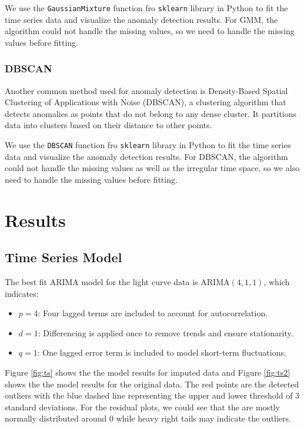 \documentclass[
]{article}
\begin{document}
We use the \texttt{GaussianMixture} function fro \texttt{sklearn} library in Python to fit the time series data and visualize the anomaly detection results. For GMM, the algorithm could not handle the missing values, so we need to handle the missing values before fitting.

\subsubsection{DBSCAN}\label{dbscan}

Another common method used for anomaly detection is Density-Based Spatial Clustering of Applications with Noise (DBSCAN), a clustering algorithm that detects anomalies as points that do not belong to any dense cluster. It partitions data into clusters based on their distance to other points.

We use the \texttt{DBSCAN} function fro \texttt{sklearn} library in Python to fit the time series data and visualize the anomaly detection results. For DBSCAN, the algorithm could not handle the missing values as well as the irregular time space, so we also need to handle the missing values before fitting.

\section{Results}\label{results}

\subsection{Time Series Model}\label{time-series-model}

The best fit ARIMA model for the light curve data is ARIMA\((4,1,1)\), which indicates:

\begin{itemize}
    \item $p = 4$: Four lagged terms are included to account for autocorrelation.
    \item $d = 1$: Differencing is applied once to remove trends and ensure stationarity.
    \item $q = 1$: One lagged error term is included to model short-term fluctuations.
\end{itemize}

Figure \ref{fig:ts} shows the the model results for imputed data and Figure \ref{fig:ts2} shows the the model results for the original data. The red points are the detected outliers with the blue dashed line representing the upper and lower threshold of 3 standard deviations. For the residual plots, we could see that the are mostly normally distributed around 0 while heavy right tails may indicate the outliers.
\end{document}
